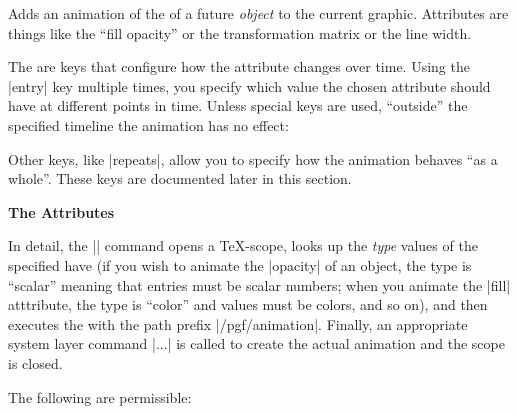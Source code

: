 \begin{command}{\pgfanimateattribute{}}
  Adds an animation of the  of a future \emph{object}
  to the current graphic. Attributes are things like the ``fill
  opacity'' or the transformation matrix or the line width.

  The  are keys that configure how the attribute changes
  over time. Using the |entry| key multiple times, you specify which
  value the chosen attribute should have at different points in
  time. Unless special keys are used, ``outside'' the specified
  timeline the animation has no effect:

\begin{codeexample}[animation list={0.5,1,1.5,2,2.5}]
\end{codeexample}

  Other keys, like |repeats|, allow you to specify how the
  animation behaves ``as a whole''. These keys are documented later in
  this section.
  
  \medskip
  \textbf{The Attributes}
  
  In detail, the |\pgfanimateattribute| command opens a \TeX-scope,
  looks up the \emph{type} values of the specified 
  have (if you wish to animate the |opacity| of an object, the type is
  ``scalar'' meaning that entries must be scalar numbers; when you
  animate the |fill| atttribute, the type is ``color'' and values 
  must be colors, and so on), and then executes the  with
  the path prefix |/pgf/animation|. Finally, an appropriate system
  layer command |\pgfsysanimate...| is called to create the actual
  animation and the scope is closed.

  The following  are permissible:
  

\end{command}
